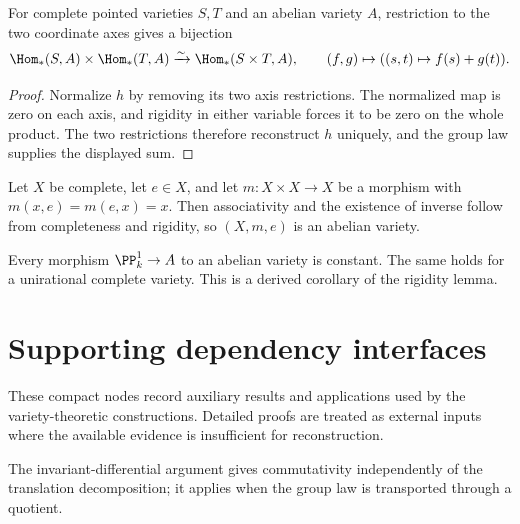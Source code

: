 \begin{corollary}
\label{mumford-cor-pointed-hom-linear}
For complete pointed varieties $S,T$ and an abelian variety $A$, restriction to
the two coordinate axes gives a bijection
\[
 \Hom_*(S,A)\times\Hom_*(T,A)\xrightarrow{\sim}
 \Hom_*(S\times T,A),\qquad (f,g)\mapsto((s,t)\mapsto f(s)+g(t)).
\]
\begin{proof}
Normalize $h$ by removing its two axis restrictions.  The normalized map is
zero on each axis, and rigidity in either variable forces it to be zero on the
whole product.  The two restrictions therefore reconstruct $h$ uniquely, and
the group law supplies the displayed sum.
\end{proof}
\notready
\end{corollary}

\begin{theorem}
\label{mumford-thm-unital-composition}
Let $X$ be complete, let $e\in X$, and let $m:X\times X\to X$ be a morphism
with $m(x,e)=m(e,x)=x$.  Then associativity and the existence of inverse follow
from completeness and rigidity, so $(X,m,e)$ is an abelian variety.
\notready
\end{theorem}

\begin{corollary}
\label{mumford-cor-no-rational-curves}
Every morphism $\PP^1_k\to A$ to an abelian variety is constant.  The same
holds for a unirational complete variety.  This is a derived corollary of the
rigidity lemma.
\notready
\end{corollary}

\section{Supporting dependency interfaces}
\label{mumford-II-coverage-register}
These compact nodes record auxiliary results and applications used by the
variety-theoretic constructions.  Detailed proofs are treated as external
inputs where the available evidence is insufficient for reconstruction.

\begin{remark}
\label{ch02-sec04-commutativity-first-proof}
The invariant-differential argument gives commutativity independently of the
translation decomposition; it applies when the group law is transported
through a quotient.
\notready
\end{remark}

